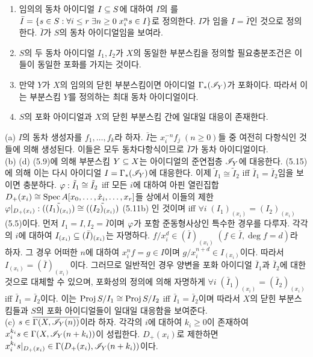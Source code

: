 \begin{enumerate}[label=\tb{5.\arabic*.},itemindent=0mm,itemsep=4mm]
	\begin{enumerate}[label=(\alph*)]
	\item 임의의 동차 아이디얼 $I\subseteq S$에 대하여 $I$의 를
	$\bar I=\{s\in S:\forall i\le r\;\exists n\ge 0\;x_i^ns\in I\}$로 정의한다.
	$I$가 임을 $I=\bar I$인 것으로 정의한다. $\bar I$가 $S$의 동차 아이디얼임을 보여라.
	\item $S$의 두 동차 아이디얼 $I_1,I_2$가 $X$의 동일한 부분스킴을 정의할 필요충분조건은 이들이 동일한 포화를 가지는 것이다.
	\item 만약 $Y$가 $X$의 임의의 닫힌 부분스킴이면 아이디얼 $\Gamma_*(\mathscr{I}_Y)$가 포화이다.
	따라서 이는 부분스킴 $Y$를 정의하는 최대 동차 아이디얼이다.
	\item $S$의 포화 아이디얼과 $X$의 닫힌 부분스킴 간에 일대일 대응이 존재한다.
	\end{enumerate}
	\sol (a) $I$의 동차 생성자를 $f_1,\ldots,f_k$라 하자.
	$\bar I$는 $x_i^{-n}f_j\;(n\ge 0)$들 중 여전히 다항식인 것들에 의해 생성된다.
	이들은 모두 동차다항식이므로 $\bar I$가 동차 아이디얼이다.\\
	(b) (d) (5.9)에 의해 부분스킴 $Y\subseteq X$는 아이디얼의 준연접층 $\mathscr{I}_Y$에 대응한다.
	(5.15)에 의해 이는 다시 아이디얼 $I=\Gamma_*(\mathscr{I}_Y)$에 대응한다.
	이제 $\tilde I_1\cong\tilde I_2$ iff $\bar I_1=\bar I_2$임을 보이면 충분하다.
	$\varphi:\tilde I_1\cong\tilde I_2$ iff 모든 $i$에 대하여 아핀 열린집합 $D_+(x_i)\cong\operatorname{Spec} A[x_0,\ldots,\hat x_i,\ldots,x_r]$들
	상에서 이들의 제한 $\varphi|_{D_+(x_i)}:\tilde{((I_1)_{(x_i)})}\cong\tilde{((I_2)_{(x_i)})}$ (5.11b) 인 것이며
	iff $\forall i\;(I_1)_{(x_i)}=(I_2)_{(x_i)}$ (5.5)이다.
	먼저 $I_1=I,I_2=\bar I$이며 $\varphi$가 포함 준동형사상인 특수한 경우를 다루자.
	각각의 $i$에 대하여 $I_{(x_i)}\subseteq(\bar I)_{(x_i)}$는 자명하다.
	$f/x_i^d\in(\bar I)_{(x_i)}\;(f\in\bar I,\deg f=d)$라 하자. 그 경우 어떠한 $n$에 대하여 $x_i^nf=g\in I$이며
	$g/x_i^{n+d}\in I_{(x_i)}$이다. 따라서 $I_{(x_i)}=(\bar I)_{(x_i)}$이다.
	그러므로 일반적인 경우 양변을 포화 아이디얼 $\bar I_1$과 $\bar I_2$에 대한 것으로 대체할 수 있으며,
	포화성의 정의에 의해 자명하게 $\forall i\;(\bar I_1)_{(x_i)}=(\bar I_2)_{(x_i)}$ iff $\bar I_1=\bar I_2$이다.
	이는 $\operatorname{Proj} S/I_1\cong\operatorname{Proj} S/I_2$ iff $\bar I_1=\bar I_2$이며
	따라서 $X$의 닫힌 부분스킴들과 $S$의 포화 아이디얼들이 일대일 대응함을 보여준다.\\
	(c) $s\in\overline{\Gamma(X,\mathscr{I}_Y(n))}$이라 하자.
	각각의 $i$에 대하여 $k_i\ge 0$이 존재하여 $x_i^{k_i}s\in\Gamma(X,\mathscr{I}_Y(n+k_i))$이 성립한다.
	$D_+(x_i)$로 제한하면 $x_i^{k_i}s|_{D_+(x_i)}\in\Gamma(D_+(x_i),\mathscr{I}_Y(n+k_i))$이다.

\end{enumerate}
